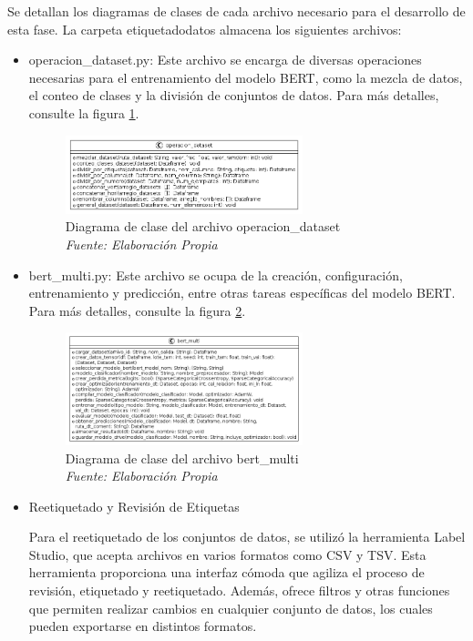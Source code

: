 Se detallan los diagramas de clases de cada archivo necesario para el desarrollo de esta fase. La carpeta etiquetadodatos almacena los siguientes archivos:

\begin{itemize}

\item operacion\_dataset.py: Este archivo se encarga de diversas operaciones necesarias para el entrenamiento del modelo BERT, como la mezcla de datos, el conteo de clases y la división de conjuntos de datos. Para más detalles, consulte la figura \ref{fig:uml5}.

\begin{figure}[h!]
	\includegraphics[width=0.65\textwidth]{capitulo5/figuras/fig5.png}
	\caption[Diagrama de clase del archivo operacion\_dataset]{Diagrama de clase del archivo operacion\_dataset
		\\\textit{Fuente: Elaboración Propia}}
	\label{fig:uml5}
\end{figure}

\item bert\_multi.py: Este archivo se ocupa de la creación, configuración, entrenamiento y predicción, entre otras tareas específicas del modelo BERT. Para más detalles, consulte la figura \ref{fig:uml6}.

\begin{figure}[h!]
	\includegraphics[width=0.65\textwidth]{capitulo5/figuras/fig6.png}
	\caption[Diagrama de clase del archivo bert\_multi]{Diagrama de clase del archivo bert\_multi
		\\\textit{Fuente: Elaboración Propia}}
	\label{fig:uml6}
\end{figure}


\item{Reetiquetado y Revisión de Etiquetas}

Para el reetiquetado de los conjuntos de datos, se utilizó la herramienta Label Studio, que acepta archivos en varios formatos como CSV y TSV. Esta herramienta proporciona una interfaz cómoda que agiliza el proceso de revisión, etiquetado y reetiquetado. Además, ofrece filtros y otras funciones que permiten realizar cambios en cualquier conjunto de datos, los cuales pueden exportarse en distintos formatos.

\end{itemize}

